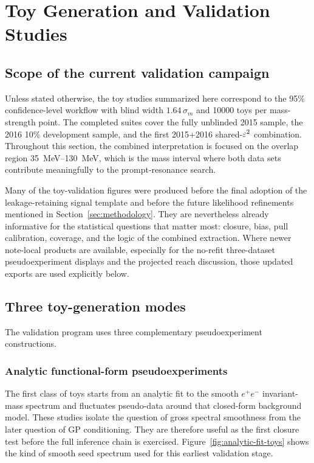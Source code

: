 \section{Toy Generation and Validation Studies}
\label{sec:toys}

\subsection{Scope of the current validation campaign}

Unless stated otherwise, the toy studies summarized here correspond to the 95\%
confidence-level workflow with blind width $1.64\,\sigma_m$ and \num{10000} toys per
mass-strength point. The completed suites cover the fully unblinded 2015 sample, the
2016 10\% development sample, and the first 2015+2016 shared-$\varepsilon^2$ combination.
Throughout this section, the combined interpretation is focused on the overlap region
\SIrange{35}{130}{MeV}, which is the mass interval where both data sets contribute
meaningfully to the prompt-resonance search.

Many of the toy-validation figures were produced before the final adoption of the
leakage-retaining signal template and before the future likelihood refinements
mentioned in Section~\ref{sec:methodology}. They are nevertheless already informative
for the statistical questions that matter most: closure, bias, pull calibration,
coverage, and the logic of the combined extraction. Where newer note-local products are
available, especially for the no-refit three-dataset pseudoexperiment displays and the
projected reach discussion, those updated exports are used explicitly below.

\subsection{Three toy-generation modes}

The validation program uses three complementary pseudoexperiment constructions.

\subsubsection{Analytic functional-form pseudoexperiments}

The first class of toys starts from an analytic fit to the smooth $e^+e^-$
invariant-mass spectrum and fluctuates pseudo-data around that closed-form background
model. These studies isolate the question of gross spectral smoothness from the later
question of GP conditioning. They are therefore useful as the first closure test before
the full inference chain is exercised. Figure~\ref{fig:analytic-fit-toys} shows the
kind of smooth seed spectrum used for this earliest validation stage.

